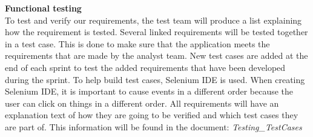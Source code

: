 \noindent\textbf{Functional testing}\\
To test and verify our requirements, the test team will produce a list explaining how the requirement is tested. Several linked requirements will be tested together in a test case. This is done to make sure that the application meets the requirements that are made by the analyst team. New test cases are added at the end of each sprint to test the added requirements that have been developed during the sprint. To help build test cases, Selenium IDE is used. When creating Selenium IDE, it is important to cause events in a different order because the user can click on things in a different order. All requirements will have an explanation text of how they are going to be verified and which test cases they are part of. This information will be found in the document: \textit{Testing\_TestCases}  \\

